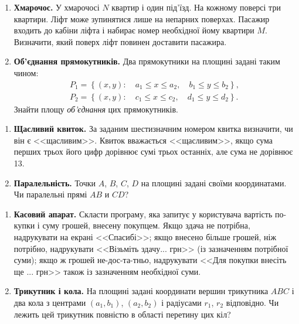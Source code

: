 \documentclass{scrreprt}
\begin{document}
	
	{\large
		\begin{enumerate}
			\item \textbf{Хмарочос.} У хмарочосі $N$ квартир і один під'їзд. На кожному поверсі три квартири. Ліфт може зупинятися лише на непарних поверхах. Пасажир входить до кабіни ліфта і набирає номер необхідної йому квартири $M$. Визначити, який поверх ліфт повинен доставити пасажира.
			\item \textbf{Об'єднання прямокутників.} Два прямокутники на площині задані таким чином:
			$$
			\begin{array}{c}
				P_1 = \left\{(x, y):\quad a_1\leqslant x\leqslant a_2,\quad b_1\leqslant y\leqslant b_2\right\},\\ 
				P_2 = \left\{(x, y):\quad c_1\leqslant x\leqslant c_2,\quad d_1\leqslant y\leqslant d_2\right\}.
			\end{array}
			$$
			Знайти площу {\itshape об'єднання} цих прямокутників.
		\end{enumerate}
	}
	
	\newpage
	
	
	{\large
		\begin{enumerate}
			\item \textbf{Щасливий квиток.} За заданим шестизначним номером квитка визначити, чи він є <<щасливим>>. Квиток вважається <<щасливим>>, якщо сума перших трьох його цифр дорівнює сумі трьох останніх, але сума не дорівнює 13.
			\item \textbf{Паралельність.} Точки $A$, $B$, $C$, $D$ на площині задані своїми координатами. Чи паралельні прямі $AB$ и $CD$?
		\end{enumerate}
	}
	
	\vspace{2cm}
	
	
	{\large
		\begin{enumerate}
			\item \textbf{Касовий апарат.} Скласти програму, яка запитує у користувача вартість по-купки і суму грошей, внесену покупцем. Якщо здача не потрібна, надрукувати на екрані <<Спасибі>>; якщо внесено більше грошей, ніж потрібно, надрукувати <<Візьміть здачу... грн>> (із зазначенням потрібної суми); якщо ж грошей не-дос-та-тньо, надрукувати <<Для покупки внесіть ще ... грн>> також із зазначенням необхідної суми.
			\item \textbf{Трикутник і кола.} На площині задані координати вершин трикутника $ABC$ і два кола з центрами $\left(a_1, b_1\right)$, $\left(a_2, b_2\right)$ і радіусами $ r_1$, $r_2$ відповідно. Чи лежить цей трикутник повністю в області перетину цих кіл?
		\end{enumerate}
	}
	
\end{document}
